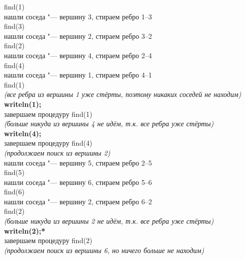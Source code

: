 \vspace{0.3cm}

{\newcommand{\ind}{\hspace*{1cm}}\footnotesize\noindent
find(1)\\
нашли соседа "--- вершину 3, стираем ребро 1--3\\
\ind find(3)\\
\ind нашли соседа "--- вершину 2, стираем ребро 3--2\\
\ind \ind find(2)\\
\ind \ind нашли соседа "--- вершину 4, стираем ребро 2--4\\
\ind \ind \ind find(4)\\
\ind \ind \ind нашли соседа "--- вершину 1, стираем ребро 4--1\\
\ind \ind \ind \ind find(1)\\
\ind \ind \ind \ind \textit{(все ребра из вершины 1 уже стёрты, поэтому 
                                      никаких соседей не находим)}\\
\ind \ind \ind \ind \textbf{writeln(1);}\\
\ind \ind \ind \ind завершаем процедуру find(1)\\
\ind \ind \ind \textit{(больше никуда из вершины 4 не идём, т.к. все ребра уже стёрты)}\\
\ind \ind \ind \textbf{writeln(4);}\\
\ind \ind \ind завершаем процедуру find(4)\\
\ind \ind \textit{(продолжаем поиск из вершины 2)}\\
\ind \ind нашли соседа "--- вершину 5, стираем ребро 2--5\\
\ind \ind \ind find(5)\\
\ind \ind \ind нашли соседа "--- вершину 6, стираем ребро 5--6\\
\ind \ind \ind \ind find(6)\\
\ind \ind \ind \ind нашли соседа "--- вершину 2, стираем ребро 6--2\\
\ind \ind \ind \ind \ind find(2)\\
\ind \ind \ind \ind \ind \textit{(больше никуда из вершины 2 не идём, т.к. все ребра уже стёрты)}\\
\ind \ind \ind \ind \ind \textbf{writeln(2);*}\\
\ind \ind \ind \ind \ind завершаем процедуру find(2)\\
\ind \ind \ind \ind \textit{(продолжаем поиск из вершины 6, но ничего больше не находим)}\\
}

